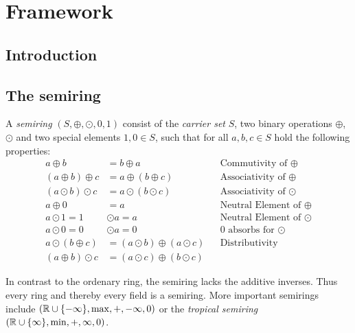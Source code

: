 \chapter{Framework}
\section{Introduction}

\section{The semiring}
\begin{definition}
    A \textit{semiring} $(S, \oplus, \odot, 0, 1)$ consist of the \textit{carrier set} $S$, two binary operations $\oplus$,$\odot$ and two special elements $1, 0 \in S$, such that for all $a, b, c \in S$ hold the following properties:
    \begin{align*}
        a \oplus b &= b \oplus a &&\textrm{Commutivity of $\oplus$}\\
        (a \oplus b) \oplus c &= a \oplus (b \oplus c) &&\textrm{Associativity of $\oplus$}\\
        (a \odot b) \odot c &= a \odot (b \odot c) &&\textrm{Associativity of $\odot$}\\
        a \oplus 0 &= a &&\textrm{Neutral Element of $\oplus$}\\
        a \odot 1 = 1 &\odot a = a &&\textrm{Neutral Element of $\odot$}\\
        a \odot 0 = 0 &\odot a = 0 &&\textrm{0 absorbs for $\odot$}\\
        a \odot (b \oplus c) &= (a \odot b) \oplus (a \odot c) &&\textrm{Distributivity}\\
        (a \oplus b) \odot c &= (a \odot c) \oplus (b \odot c)
    \end{align*}
\end{definition}
In contrast to the ordenary ring, the semiring lacks the additive inverses. Thus every ring and thereby every field is a semiring. More important semirings include $(\mathbb{R} \cup \{-\infty\}, \max, +, -\infty, 0)$ or the \textit{tropical semiring} $(\mathbb{R} \cup \{\infty\}, \min, +, \infty, 0)$.

